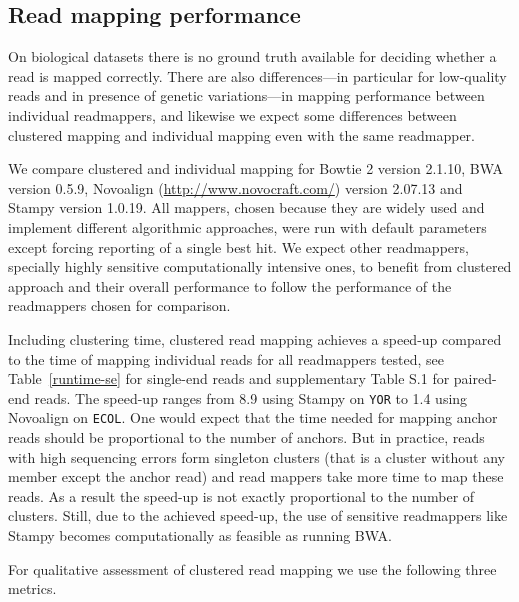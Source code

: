 \documentclass[a4paper]{article}
\begin{document}
\subsection{Read mapping performance}
\label{cluster-tool-comp}
On biological datasets there is no ground truth
available for deciding whether a read is mapped correctly.  There are
also differences---in particular for low-quality reads and in presence
of genetic variations---in mapping performance between individual readmappers, and
likewise we expect some differences between clustered mapping and
individual mapping even with the same readmapper.

We compare clustered and individual mapping for Bowtie 2
\cite{Langmead2012} version 2.1.10, BWA \cite{Li15072009} version 0.5.9,
Novoalign (\url{http://www.novocraft.com/}) version 2.07.13 and
Stampy \cite{Lunter2011} version 1.0.19.
All mappers, chosen because they are widely used and implement different
algorithmic approaches, were run with default parameters except forcing
reporting of a single best hit. We expect other readmappers, specially highly sensitive
computationally intensive ones, to benefit from clustered approach and their overall performance to
follow the performance of the readmappers chosen for comparison.

Including clustering time, clustered read mapping achieves a speed-up
compared to the time of mapping individual reads for all readmappers
tested, see Table~\ref{runtime-se} for single-end reads and supplementary Table S.1 for paired-end reads. The speed-up ranges from
8.9 using Stampy on {\tt YOR} to 1.4 using Novoalign on {\tt ECOL}.
One would expect that the time needed for mapping anchor reads should
be proportional to the number of anchors. But in practice, reads
with
high sequencing errors form singleton clusters (that
is a cluster without any member except the anchor read) and read
mappers take more time to map these reads.  As a result the speed-up is
not exactly proportional to the number of clusters. Still, due to the achieved
speed-up, the use of sensitive readmappers
like Stampy becomes computationally as feasible as running BWA.

For qualitative assessment of clustered read mapping we use the following
three metrics.
\end{document}
